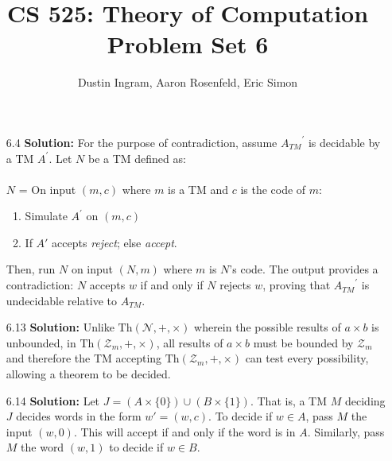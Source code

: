 \documentclass{article}
\title{CS 525: Theory of Computation\\ Problem Set 6}
\author{Dustin Ingram, Aaron Rosenfeld, Eric Simon}
\begin{document}
\maketitle
\begin{enumerate}
    \item[6.4] \textbf{Solution:}
    For the purpose of contradiction, assume ${A_{TM}}^\prime$ is decidable by a TM $A^\prime$.  Let $N$ be a TM defined
    as:\\ \\
    $N$ = On input $(m,c)$ where $m$ is a TM and $c$ is the code of $m$:
    \begin{enumerate}
        \item Simulate $A^\prime$ on $(m, c)$
        \item If $A'$ accepts \textit{reject}; else \textit{accept}.
    \end{enumerate}

    Then, run $N$ on input $(N, m)$ where $m$ is $N$'s code.  The output provides a contradiction: $N$ accepts $w$ if and only if $N$ rejects $w$,
    proving that ${A_{TM}}^\prime$ is undecidable relative to $A_{TM}$.

    \item[6.13] \textbf{Solution:}
    Unlike $\text{Th}(\mathcal{N}, +, \times)$ wherein the possible results of $a \times b$ is unbounded, in
    $\text{Th}(\mathcal{Z}_m, +, \times)$, all results of $a \times b$ must be bounded by $\mathcal{Z}_m$ and therefore
    the TM accepting $\text{Th}(\mathcal{Z}_m, +, \times)$ can test every possibility, allowing a theorem to be decided.

    \item[6.14] \textbf{Solution:}
    Let $J=\left(A \times \{0\}\right) \cup \left(B \times \{1\}\right)$.  That is, a TM $M$ deciding $J$
    decides words in the form $w'=(w, c)$.  To decide if $w \in A$, pass $M$ the input $(w, 0)$.  This will accept if
    and only if the word is in $A$.  Similarly, pass $M$ the word $(w, 1)$ to decide if $w \in B$.

    \end{enumerate}
\end{document}
